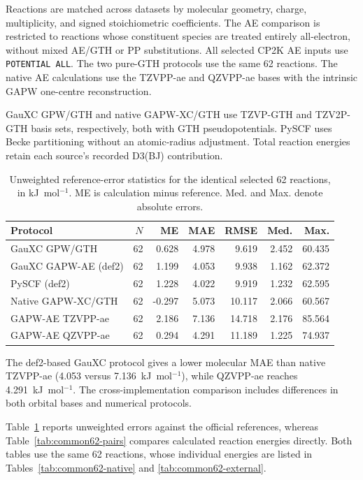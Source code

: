 \documentclass[10pt,a4paper]{article}
\begin{document}
Reactions are matched across datasets by molecular geometry, charge, multiplicity, and signed stoichiometric coefficients. The AE comparison is restricted to reactions whose constituent species are treated entirely all-electron, without mixed AE/GTH or PP substitutions. All selected CP2K AE inputs use \texttt{POTENTIAL ALL}. The two pure-GTH protocols use the same 62 reactions. The native AE calculations use the TZVPP-ae and QZVPP-ae bases with the intrinsic GAPW one-centre reconstruction.

GauXC GPW/GTH and native GAPW-XC/GTH use TZVP-GTH and TZV2P-GTH basis sets, respectively, both with GTH pseudopotentials. PySCF uses Becke partitioning without an atomic-radius adjustment. Total reaction energies retain each source's recorded D3(BJ) contribution.

\begin{table}[htbp]
\centering\small
\caption{Unweighted reference-error statistics for the identical selected 62 reactions, in kJ~mol$^{-1}$. ME is calculation minus reference. Med. and Max. denote absolute errors.}\label{tab:common62-summary}
\begin{tabular}{@{}lrrrrrr@{}}
\toprule
Protocol & $N$ & ME & MAE & RMSE & Med. & Max. \\
\midrule
GauXC GPW/GTH & 62 & 0.628 & 4.978 & 9.619 & 2.452 & 60.435 \\
GauXC GAPW-AE (def2) & 62 & 1.199 & 4.053 & 9.938 & 1.162 & 62.372 \\
PySCF (def2) & 62 & 1.228 & 4.022 & 9.919 & 1.232 & 62.595 \\
Native GAPW-XC/GTH & 62 & -0.297 & 5.073 & 10.117 & 2.066 & 60.567 \\
GAPW-AE TZVPP-ae & 62 & 2.186 & 7.136 & 14.718 & 2.176 & 85.564 \\
GAPW-AE QZVPP-ae & 62 & 0.294 & 4.291 & 11.189 & 1.225 & 74.937 \\
\bottomrule
\end{tabular}
\end{table}


The def2-based GauXC protocol gives a lower molecular MAE than native TZVPP-ae (4.053 versus 7.136~kJ~mol$^{-1}$), while QZVPP-ae reaches 4.291~kJ~mol$^{-1}$.  The cross-implementation comparison includes differences in both orbital bases and numerical protocols.

Table~\ref{tab:common62-summary} reports unweighted errors against the official references, whereas Table~\ref{tab:common62-pairs} compares calculated reaction energies directly. Both tables use the same 62 reactions, whose individual energies are listed in Tables~\ref{tab:common62-native} and \ref{tab:common62-external}.
\end{document}
